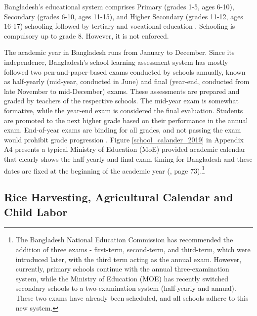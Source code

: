 \documentclass[12pt,letterpaper]{article}
\newcommand{\0}{\ensuremath{\mbox{\boldmath $0$}}}
\begin{document}
Bangladesh's educational system comprises Primary (grades 1-5, ages 6-10), Secondary (grades 6-10, ages 11-15), and Higher Secondary (grades 11-12, ages 16-17) schooling followed by tertiary and vocational education \citep{kono2018primary}. Schooling is compulsory up to grade 8. However, it is not enforced. 

The academic year in Bangladesh runs from January to December. Since its independence, Bangladesh's school learning assessment system has mostly followed two pen-and-paper-based exams conducted by schools annually, known as half-yearly (mid-year, conducted in June) and final (year-end, conducted from late November to mid-December) exams. These assessments are prepared and graded by teachers of the respective schools. The mid-year exam is somewhat formative, while the year-end exam is considered the final evaluation. Students are promoted to the next higher grade based on their performance in the annual exam. End-of-year exams are binding for all grades, and not passing the exam would prohibit grade progression \citep{de2004school,begum2008school,ADB2017}. Figure \ref{school_calander_2019} in Appendix A4 presents a typical Ministry of Education (MoE) provided academic calendar that clearly shows the half-yearly and final exam timing for Bangladesh and these dates are fixed at the beginning of the academic year (\cite{ADB2017}, page 73).\footnote{The Bangladesh National Education Commission has recommended the addition of three exams - first-term, second-term, and third-term, which were introduced later, with the third term acting as the annual exam. However, currently, primary schools continue with the annual three-examination system, while the Ministry of Education (MOE) has recently switched secondary schools to a two-examination system (half-yearly and annual). These two exams have already been scheduled, and all schools adhere to this new system. } 


\subsection{Rice Harvesting, Agricultural Calendar and Child Labor \label{sec.rice}}
\end{document}
